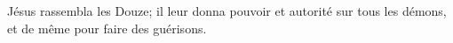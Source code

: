 \encetemps Jésus rassembla les Douze;
	il leur donna pouvoir et autorité sur tous les démons,
	et de même pour faire des guérisons.
